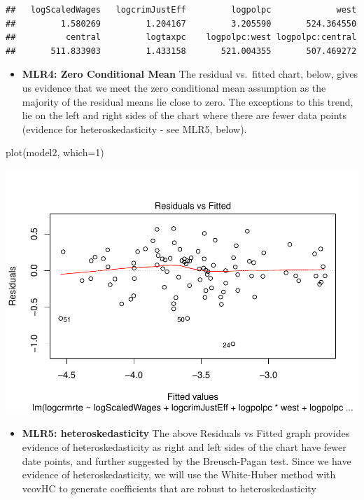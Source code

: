 \documentclass[]{article}
\newenvironment{Shaded}{}{}
\newcommand{\DataTypeTok}[1]{#1}
\newcommand{\DecValTok}[1]{#1}
\newcommand{\KeywordTok}[1]{\textcolor[rgb]{0.00,0.00,1.00}{#1}}
\newcommand{\NormalTok}[1]{#1}
\providecommand{\tightlist}{%
  \setlength{\itemsep}{0pt}\setlength{\parskip}{0pt}}
\begin{document}
\begin{verbatim}
##   logScaledWages   logcrimJustEff         logpolpc             west 
##         1.580269         1.204167         3.205590       524.364550 
##          central         logtaxpc    logpolpc:west logpolpc:central 
##       511.833903         1.433158       521.004355       507.469272
\end{verbatim}

\begin{itemize}
\tightlist
\item
  \textbf{MLR4: Zero Conditional Mean} The residual vs.~fitted chart,
  below, gives us evidence that we meet the zero conditional mean
  assumption as the majority of the residual means lie close to zero.
  The exceptions to this trend, lie on the left and right sides of the
  chart where there are fewer data points (evidence for
  heteroskedasticity - see MLR5, below).
\end{itemize}

\begin{Shaded}
\begin{Highlighting}[]
\KeywordTok{plot}\NormalTok{(model2, }\DataTypeTok{which=}\DecValTok{1}\NormalTok{)}
\end{Highlighting}
\end{Shaded}

\includegraphics{Bagnard_Gaustad_Hartman_Leung_Lab_3_files/figure-latex/unnamed-chunk-72-1.pdf}

\begin{itemize}
\tightlist
\item
  \textbf{MLR5: heteroskedasticity} The above Residuals vs Fitted graph
  provides evidence of heteroskedasticity as right and left sides of the
  chart have fewer date points, and further suggested by the
  Breusch-Pagan test. Since we have evidence of heteroskedasticity, we
  will use the White-Huber method with vcovHC to generate coefficients
  that are robust to heteroskedasticity
\end{itemize}
\end{document}
